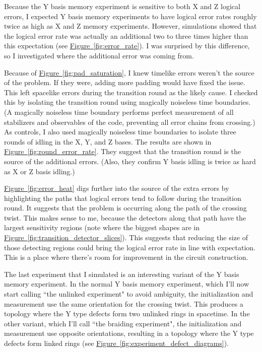 \documentclass[onecolumn,unpublished,a4paper]{quantumarticle}
\theoremstyle{definition}
\theoremstyle{definition}
\theoremstyle{definition}
\newcommand{\fig}[1]{\hyperref[fig:#1]{Figure~\ref*{fig:#1}}}
\begin{document}
Because the Y basis memory experiment is sensitive to both X and Z logical errors, I expected Y basis memory experiments to have logical error rates roughly twice as high as X and Z memory experiments.
However, simulations showed that the logical error rate was actually an additional two to three times higher than this expectation (see \fig{error_rate}).
I was surprised by this difference, so I investigated where the additional error was coming from.

Because of \fig{pad_saturation}, I knew timelike errors weren't the source of the problem.
If they were, adding more padding would have fixed the issue.
This left spacelike errors during the transition round as the likely cause.
I checked this by isolating the transition round using magically noiseless time boundaries.
(A magically noiseless time boundary performs perfect measurement of all stabilizers and observables of the code, preventing all error chains from crossing.)
As controls, I also used magically noiseless time boundaries to isolate three rounds of idling in the X, Y, and Z bases.
The results are shown in \fig{round_error_rate}.
They suggest that the transition round is the source of the additional errors.
(Also, they confirm Y basis idling is twice as hard as X or Z basis idling.)

\fig{error_heat} digs further into the source of the extra errors by highlighting the paths that logical errors tend to follow during the transition round.
It suggests that the problem is occurring along the path of the crossing twist.
This makes sense to me, because the detectors along that path have the largest sensitivity regions (note where the biggest shapes are in \fig{transition_detector_slices}).
This suggests that reducing the size of those detecting regions could bring the logical error rate in line with expectation.
This is a place where there's room for improvement in the circuit construction.

The last experiment that I simulated is an interesting variant of the Y basis memory experiment.
In the normal Y basis memory experiment, which I'll now start calling ``the unlinked experiment" to avoid ambiguity, the initialization and measurement use the same orientation for the crossing twist.
This produces a topology where the Y type defects form two unlinked rings in spacetime.
In the other variant, which I'll call ``the braiding experiment", the initialization and measurement use opposite orientations, resulting in a topology where the Y type defects form linked rings (see \fig{experiment_defect_diagrams}).
\end{document}
